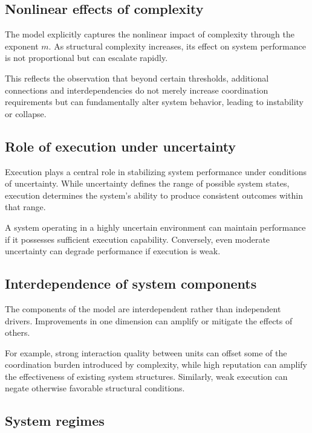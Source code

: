 \documentclass[11pt,a4paper]{article}
\theoremstyle{definition}
\begin{document}
\subsection{Nonlinear effects of complexity}
\label{subsec:complexity_effects}

The model explicitly captures the nonlinear impact of complexity through the exponent $m$.
As structural complexity increases, its effect on system performance is not proportional but can escalate rapidly.

This reflects the observation that beyond certain thresholds, additional connections and interdependencies do not merely increase coordination requirements but can fundamentally alter system behavior, leading to instability or collapse.

\subsection{Role of execution under uncertainty}
\label{subsec:execution_uncertainty}

Execution plays a central role in stabilizing system performance under conditions of uncertainty.
While uncertainty defines the range of possible system states, execution determines the system's ability to produce consistent outcomes within that range.

A system operating in a highly uncertain environment can maintain performance if it possesses sufficient execution capability.
Conversely, even moderate uncertainty can degrade performance if execution is weak.

\subsection{Interdependence of system components}
\label{subsec:interdependence}

The components of the model are interdependent rather than independent drivers.
Improvements in one dimension can amplify or mitigate the effects of others.

For example, strong interaction quality between units can offset some of the coordination burden introduced by complexity, while high reputation can amplify the effectiveness of existing system structures.
Similarly, weak execution can negate otherwise favorable structural conditions.

\subsection{System regimes}
\label{subsec:regimes}
\end{document}
